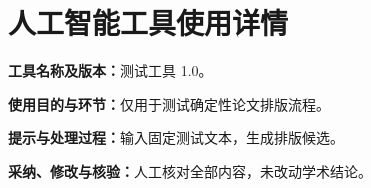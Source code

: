 \documentclass[UTF8,fontset=fandol,a4paper]{ctexart}
\begin{document}
\section*{人工智能工具使用详情}
\textbf{工具名称及版本：}测试工具 1.0。

\textbf{使用目的与环节：}仅用于测试确定性论文排版流程。

\textbf{提示与处理过程：}输入固定测试文本，生成排版候选。

\textbf{采纳、修改与核验：}人工核对全部内容，未改动学术结论。
\end{document}
